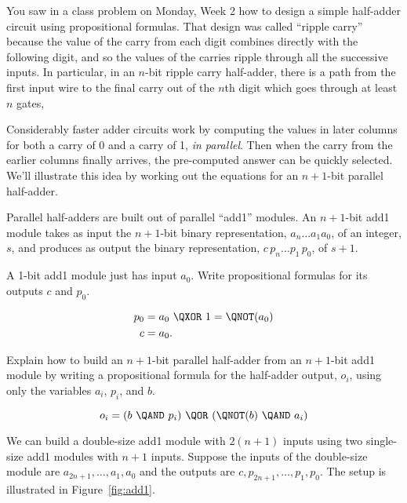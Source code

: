 \documentclass[handout]{mcs}
\begin{document}
\begin{problem}
  You saw in a class problem on Monday, Week 2 how to design a simple
  half-adder circuit using propositional formulas.  That design was called
  ``ripple carry'' because the value of the carry from each digit combines
  directly with the following digit, and so the values of the carries
  ripple through all the successive inputs.  In particular, in an $n$-bit
  ripple carry half-adder, there is a path from the first input wire to
  the final carry out of the $n$th digit which goes through at least $n$
  gates,

Considerably faster adder circuits work by computing the values in later
columns for both a carry of 0 and a carry of 1, \emph{in parallel}.  Then
when the carry from the earlier columns finally arrives, the pre-computed
answer can be quickly selected.  We'll illustrate this idea by working out
the equations for an $n+1$-bit parallel half-adder.

Parallel half-adders are built out of parallel ``add1'' modules.  An
$n+1$-bit add1 module takes as input the $n+1$-bit binary representation,
$a_n \dots a_1 a_0$, of an integer, $s$, and produces as output the binary
representation, $c\,p_n\dots p_1\,p_0$, of $s+1$.

\bparts

\ppart A 1-bit add1 module just has input $a_0$.  Write propositional
formulas for its outputs $c$ and $p_0$.

\begin{solution}

\begin{align}
p_0 & = a_0\ \QXOR\ 1 = \QNOT(a_0)\\
c & = a_0.
\end{align}

\end{solution}

\ppart Explain how to build an $n+1$-bit parallel half-adder from an
$n+1$-bit add1 module by writing a propositional formula for the
half-adder output, $o_i$, using only the variables $a_i$, $p_i$, and $b$.

\begin{solution}

\[
o_i  = (b\ \QAND\ p_i)\ \QOR\ (\QNOT(b)\ \QAND\ a_i)
\]

\end{solution}

\eparts

We can build a double-size add1 module with $2(n+1)$ inputs using two
single-size add1 modules with $n+1$ inputs.  Suppose the inputs of the
double-size module are $a_{2n+1},\dots, a_1, a_0$ and the outputs are
$c,p_{2n+1},\dots, p_1,p_0$.  The setup is illustrated in
Figure~\ref{fig:add1}.


\end{problem}
\end{document}
